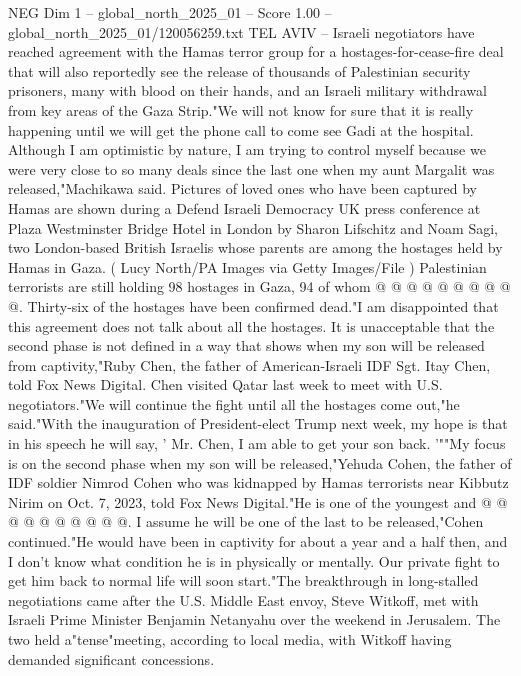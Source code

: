 \begin{textsample}{NEG Dim 1 – global\_north\_2025\_01 – Score 1.00 – global\_north\_2025\_01/120056259.txt}  \label{ex:f1_neg_086}
TEL AVIV -- Israeli negotiators have reached agreement with the Hamas terror group for a hostages-for-cease-fire deal that will also reportedly see the release of thousands of Palestinian security prisoners, many with blood on their hands, and an Israeli military withdrawal from key areas of the Gaza Strip."We will not know for sure that it is really happening until we will get the phone call to come see Gadi at the hospital.
Although I am optimistic by nature, I am trying to control myself because we were very close to so many deals since the last one when my aunt Margalit was released,"Machikawa said.
Pictures of loved ones who have been captured by Hamas are shown during a Defend Israeli Democracy UK press conference at Plaza Westminster Bridge Hotel in London by Sharon Lifschitz and Noam Sagi, two London-based British Israelis whose parents are among the hostages held by Hamas in Gaza. ( Lucy North/PA Images via Getty Images/File ) Palestinian terrorists are still holding 98 hostages in Gaza, 94 of whom @ @ @ @ @ @ @ @ @ @.
Thirty-six of the hostages have been confirmed dead."I am disappointed that this agreement does not talk about all the hostages.
It is unacceptable that the second phase is not defined in a way that shows when my son will be released from captivity,"Ruby Chen, the father of American-Israeli IDF Sgt.
Itay Chen, told Fox News Digital.
Chen visited Qatar last week to meet with U.S. negotiators."We will continue the fight until all the hostages come out,"he said."With the inauguration of President-elect Trump next week, my hope is that in his speech he will say, ' Mr.
Chen, I am able to get your son back. '""My focus is on the second phase when my son will be released,"Yehuda Cohen, the father of IDF soldier Nimrod Cohen who was kidnapped by Hamas terrorists near Kibbutz Nirim on Oct. 7, 2023, told Fox News Digital."He is one of the youngest and @ @ @ @ @ @ @ @ @ @.
I assume he will be one of the last to be released,"Cohen continued."He would have been in captivity for about a year and a half then, and I don't know what condition he is in physically or mentally.
Our private fight to get him back to normal life will soon start."The breakthrough in long-stalled negotiations came after the U.S.
Middle East envoy, Steve Witkoff, met with Israeli Prime Minister Benjamin Netanyahu over the weekend in Jerusalem.
The two held a"tense"meeting, according to local media, with Witkoff having demanded significant concessions.

\end{textsample}
